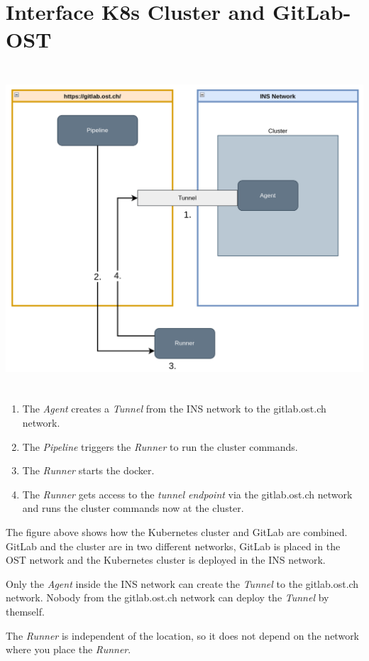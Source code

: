 \chapter{Interface K8s Cluster and GitLab-OST}

\includegraphics[height=12cm]{resources/k8s_including_in_gitlab-ost.png}
\begin{enumerate}
    \item The \textit{Agent} creates a \textit{Tunnel} from the INS network to the gitlab.ost.ch network.
    \item The \textit{Pipeline} triggers the \textit{Runner} to run the cluster commands.
    \item The \textit{Runner} starts the docker.
    \item The \textit{Runner} gets access to the \textit{tunnel endpoint} via the gitlab.ost.ch network and runs the cluster commands now at the cluster.
\end{enumerate}

\noindent The figure above shows how the Kubernetes cluster and GitLab are combined. GitLab and the cluster are in two different networks,  GitLab is placed in the OST network and the Kubernetes cluster is deployed in the INS network.

Only the \textit{Agent} inside the INS network can create the \textit{Tunnel} to the gitlab.ost.ch network. Nobody from the gitlab.ost.ch network can deploy the \textit{Tunnel} by themself.

The \textit{Runner} is independent of the location, so it does not depend on the network where you place the \textit{Runner}.